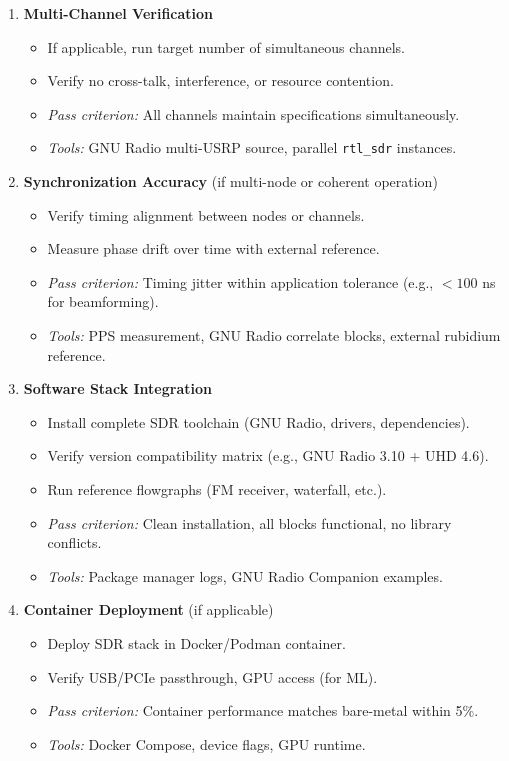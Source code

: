 \documentclass[11pt,a4paper]{article}
\begin{document}
\begin{enumerate}
  \item \textbf{Multi-Channel Verification}
  \begin{itemize}
    \item If applicable, run target number of simultaneous channels.
    \item Verify no cross-talk, interference, or resource contention.
    \item \textit{Pass criterion:} All channels maintain specifications simultaneously.
    \item \textit{Tools:} GNU Radio multi-USRP source, parallel \texttt{rtl\_sdr} instances.
  \end{itemize}

  \item \textbf{Synchronization Accuracy} (if multi-node or coherent operation)
  \begin{itemize}
    \item Verify timing alignment between nodes or channels.
    \item Measure phase drift over time with external reference.
    \item \textit{Pass criterion:} Timing jitter within application tolerance (e.g., $<100$ ns for beamforming).
    \item \textit{Tools:} PPS measurement, GNU Radio correlate blocks, external rubidium reference.
  \end{itemize}

  \item \textbf{Software Stack Integration}
  \begin{itemize}
    \item Install complete SDR toolchain (GNU Radio, drivers, dependencies).
    \item Verify version compatibility matrix (e.g., GNU Radio 3.10 + UHD 4.6).
    \item Run reference flowgraphs (FM receiver, waterfall, etc.).
    \item \textit{Pass criterion:} Clean installation, all blocks functional, no library conflicts.
    \item \textit{Tools:} Package manager logs, GNU Radio Companion examples.
  \end{itemize}

  \item \textbf{Container Deployment} (if applicable)
  \begin{itemize}
    \item Deploy SDR stack in Docker/Podman container.
    \item Verify USB/PCIe passthrough, GPU access (for ML).
    \item \textit{Pass criterion:} Container performance matches bare-metal within 5\%.
    \item \textit{Tools:} Docker Compose, device flags, GPU runtime.
  \end{itemize}


\end{enumerate}
\end{document}
